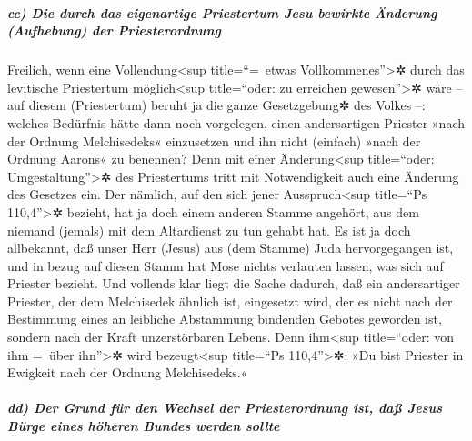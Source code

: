 \hypertarget{cc-die-durch-das-eigenartige-priestertum-jesu-bewirkte-uxe4nderung-aufhebung-der-priesterordnung}{%
\subparagraph{cc) Die durch das eigenartige Priestertum Jesu bewirkte
Änderung (Aufhebung) der
Priesterordnung}\label{cc-die-durch-das-eigenartige-priestertum-jesu-bewirkte-uxe4nderung-aufhebung-der-priesterordnung}}

 Freilich, wenn eine Vollendung\textless sup
title=``=~etwas Vollkommenes''\textgreater✲ durch das levitische
Priestertum möglich\textless sup title=``oder: zu erreichen
gewesen''\textgreater✲ wäre -- auf diesem (Priestertum) beruht ja die
ganze Gesetzgebung✲ des Volkes --: welches Bedürfnis hätte dann noch
vorgelegen, einen andersartigen Priester »nach der Ordnung Melchisedeks«
einzusetzen und ihn nicht (einfach) »nach der Ordnung Aarons« zu
benennen?  Denn mit einer Änderung\textless sup
title=``oder: Umgestaltung''\textgreater✲ des Priestertums tritt mit
Notwendigkeit auch eine Änderung des Gesetzes ein.  Der
nämlich, auf den sich jener Ausspruch\textless sup title=``Ps
110,4''\textgreater✲ bezieht, hat ja doch einem anderen Stamme angehört,
aus dem niemand (jemals) mit dem Altardienst zu tun gehabt hat.
 Es ist ja doch allbekannt, daß unser Herr (Jesus) aus
(dem Stamme) Juda hervorgegangen ist, und in bezug auf diesen Stamm hat
Mose nichts verlauten lassen, was sich auf Priester bezieht.
 Und vollends klar liegt die Sache dadurch, daß ein
andersartiger Priester, der dem Melchisedek ähnlich ist, eingesetzt
wird,  der es nicht nach der Bestimmung eines an
leibliche Abstammung bindenden Gebotes geworden ist, sondern nach der
Kraft unzerstörbaren Lebens.  Denn ihm\textless sup
title=``oder: von ihm =~über ihn''\textgreater✲ wird
bezeugt\textless sup title=``Ps 110,4''\textgreater✲: »Du bist Priester
in Ewigkeit nach der Ordnung Melchisedeks.«

\hypertarget{dd-der-grund-fuxfcr-den-wechsel-der-priesterordnung-ist-dauxdf-jesus-buxfcrge-eines-huxf6heren-bundes-werden-sollte}{%
\subparagraph{dd) Der Grund für den Wechsel der Priesterordnung ist, daß
Jesus Bürge eines höheren Bundes werden
sollte}\label{dd-der-grund-fuxfcr-den-wechsel-der-priesterordnung-ist-dauxdf-jesus-buxfcrge-eines-huxf6heren-bundes-werden-sollte}}

